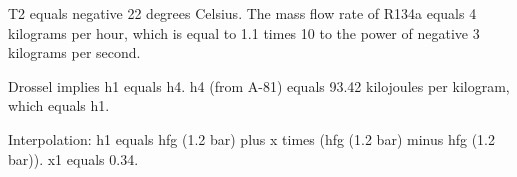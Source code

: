 T2 equals negative 22 degrees Celsius.  
The mass flow rate of R134a equals 4 kilograms per hour, which is equal to 1.1 times 10 to the power of negative 3 kilograms per second.  

Drossel implies h1 equals h4.  
h4 (from A-81) equals 93.42 kilojoules per kilogram, which equals h1.  

Interpolation:  
h1 equals hfg (1.2 bar) plus x times (hfg (1.2 bar) minus hfg (1.2 bar)).  
x1 equals 0.34.